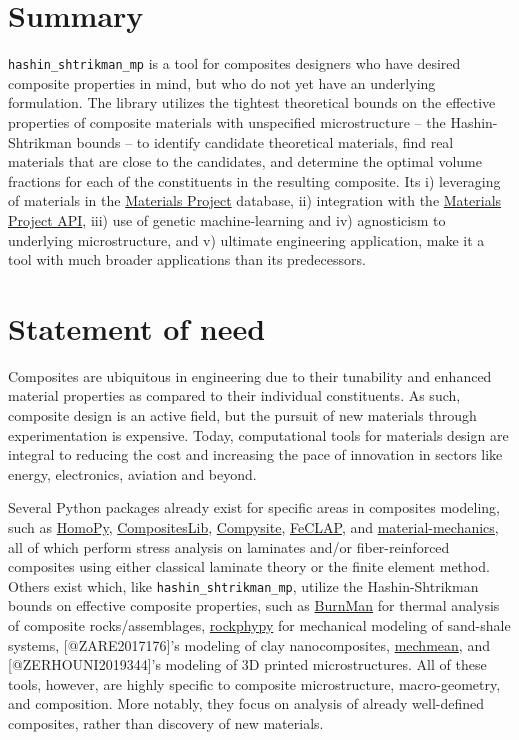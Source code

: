 \section{Summary}\label{summary}

\texttt{hashin\_shtrikman\_mp} is a tool for composites designers who
have desired composite properties in mind, but who do not yet have an
underlying formulation. The library utilizes the tightest theoretical
bounds on the effective properties of composite materials with
unspecified microstructure -- the Hashin-Shtrikman bounds -- to identify
candidate theoretical materials, find real materials that are close to
the candidates, and determine the optimal volume fractions for each of
the constituents in the resulting composite. Its i) leveraging of
materials in the \href{https://next-gen.materialsproject.org/}{Materials
Project} database, ii) integration with the
\href{https://next-gen.materialsproject.org/api}{Materials Project API},
iii) use of genetic machine-learning and iv) agnosticism to underlying
microstructure, and v) ultimate engineering application, make it a tool
with much broader applications than its predecessors.

\section{Statement of need}\label{statement-of-need}

Composites are ubiquitous in engineering due to their tunability and
enhanced material properties as compared to their individual
constituents. As such, composite design is an active field, but the
pursuit of new materials through experimentation is expensive. Today,
computational tools for materials design are integral to reducing the
cost and increasing the pace of innovation in sectors like energy,
electronics, aviation and beyond.

Several Python packages already exist for specific areas in composites
modeling, such as \href{https://github.com/Extraweich/homopy}{HomoPy},
\href{https://github.com/rafaelcidade/compositeslib}{CompositesLib},
\href{https://github.com/echaffey/Compysite}{Compysite},
\href{https://github.com/azzeddinetiba/FeCLAP}{FeCLAP}, and
\href{https://pypi.org/project/material-mechanics/}{material-mechanics},
all of which perform stress analysis on laminates and/or
fiber-reinforced composites using either classical laminate theory or
the finite element method. Others exist which, like
\texttt{hashin\_shtrikman\_mp}, utilize the Hashin-Shtrikman bounds on
effective composite properties, such as
\href{https://geodynamics.github.io/burnman/}{BurnMan} for thermal
analysis of composite rocks/assemblages,
\href{https://rockphypy.readthedocs.io/en/latest/getting_started/08_Shaly_sand_modelling.html}{rockphypy}
for mechanical modeling of sand-shale systems, {[}@ZARE2017176{]}'s
modeling of clay nanocomposites,
\href{https://github.com/JulianKarlBauer/mechmean/tree/main?tab=readme-ov-file}{mechmean},
and {[}@ZERHOUNI2019344{]}'s modeling of 3D printed microstructures. All
of these tools, however, are highly specific to composite
microstructure, macro-geometry, and composition. More notably, they
focus on analysis of already well-defined composites, rather than
discovery of new materials.

